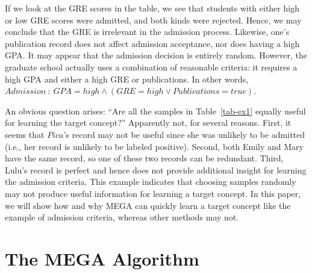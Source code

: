If we look at the GRE scores in the table, we see that students with 
either high or low GRE scores were admitted, and both kinds were
rejected. Hence, we may 
conclude that the GRE is irrelevant in the admission process. 
Likewise, one's publication record does not affect admission
acceptance, nor does having a high GPA.  
It may appear that the admission decision is entirely
random. However, the 
graduate school actually uses a combination of
reasonable criteria: it requires a
high GPA and either a high GRE or publications. In other words,
$Admission~:~ GPA = high \wedge (GRE = high \vee Publications = true)$.

An obvious question arises: ``Are all the samples in Table~\ref{tab-ex1}
equally useful for learning the target concept?''
Apparently not, for several
reasons.  First, it seems that $Pica$'s record may not be useful
since she was unlikely to be admitted (i.e., her record is unlikely
to be labeled positive). Second, both Emily and Mary have the 
same record, so one of these two records can be redundant. Third, Lulu's 
record is perfect and hence does not provide additional insight for
learning the admission criteria.  This example indicates that choosing 
samples randomly may not produce useful information for learning a 
target concept. 
In this paper, we will show how and why MEGA can quickly learn
a target concept like the example of
admission criteria, whereas other methods may not.




\section{The MEGA Algorithm}
\label{sec-learn}


